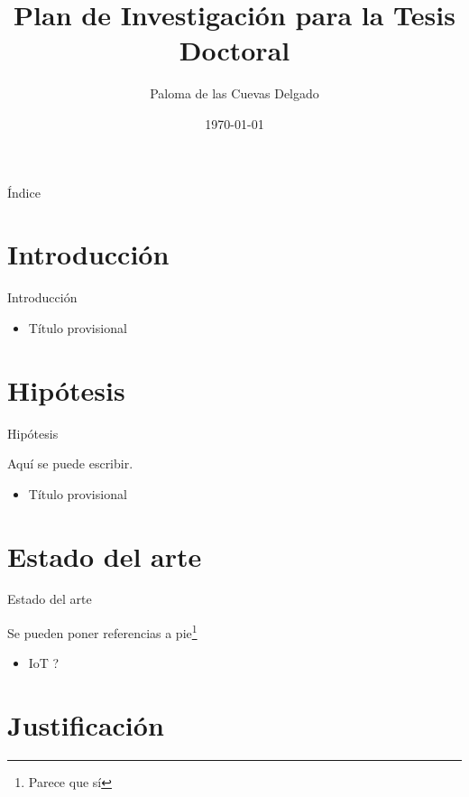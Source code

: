\documentclass{beamer}
\title[Plan de Investigación]{Plan de Investigación para la Tesis Doctoral}
\author{Paloma de las Cuevas Delgado}
\institute{Departamento de Arquitectura y Tecnología de los Computadores}
\date{\today}
\begin{document}
\begin{frame}
  \titlepage
\end{frame}

\begin{frame}{Índice}
  \tableofcontents
\end{frame}

\section{Introducción}

\begin{frame}{Introducción}

\begin{itemize}
  \item Título provisional
\end{itemize}

\end{frame}

\section{Hipótesis}

\begin{frame}{Hipótesis}

Aquí se puede escribir.

\begin{itemize}
  \item Título provisional
\end{itemize}

\end{frame}

\section{Estado del arte}

\begin{frame}{Estado del arte}

Se pueden poner referencias a pie\footnote{Parece que sí}

\begin{itemize}
  \item IoT ?
\end{itemize}

\end{frame}

\section{Justificación}
\end{document}
